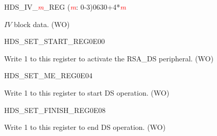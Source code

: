 


\begin{register}{H}{DS\_IV\_\textcolor{red}{\it{m}}\_REG (\textcolor{red}{\it{m}}: 0-3)}{\hexprefix{}0630+4*\textcolor{red}{\it{m}}}\label{regdesc:DSIVREG}
%
\regnewline%
\begin{regdesc}\begin{reglist}
\item [DS\_IV\_\textcolor{red}{\it{m}}\_REG (\textcolor{red}{\it{m}}: 0-3)] \begin{math}IV\end{math} block data. (WO)
\end{reglist}\end{regdesc}
\end{register}


\begin{register}{H}{DS\_SET\_START\_REG}{\hexprefix{}0E00}\label{regdesc:DSSETSTARTREG}
%
%
\regnewline%
\begin{regdesc}\begin{reglist}
\item [DS\_SET\_START] Write 1 to this register to activate the RSA\_DS peripheral. (WO)
\end{reglist}\end{regdesc}
\end{register}


\begin{register}{H}{DS\_SET\_ME\_REG}{\hexprefix{}0E04}\label{regdesc:DSSETMEREG}
%
%
\regnewline%
\begin{regdesc}\begin{reglist}
\item [DS\_SET\_ME] Write 1 to this register to start DS operation. (WO)
\end{reglist}\end{regdesc}
\end{register}


\begin{register}{H}{DS\_SET\_FINISH\_REG}{\hexprefix{}0E08}\label{regdesc:DSSETFINISHREG}
%
%
\regnewline%
\begin{regdesc}\begin{reglist}
\item [DS\_SET\_FINISH] Write 1 to this register to end DS operation. (WO)
\end{reglist}\end{regdesc}
\end{register}



